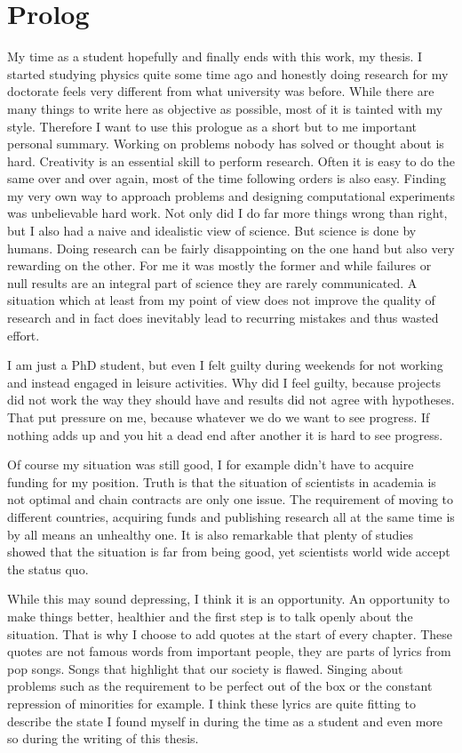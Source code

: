 \section*{Prolog}
\label{sec:prolog}
My time as a student hopefully and finally ends with this work, my thesis.
I started studying physics quite some time ago and honestly doing research for my doctorate feels very different from what university was before.
While there are many things to write here as objective as possible, most of it is tainted with my style.
Therefore I want to use this prologue as a short but to me important personal summary.
Working on problems nobody has solved or thought about is hard.
Creativity is an essential skill to perform research.
Often it is easy to do the same over and over again, most of the time following orders is also easy.
Finding my very own way to approach problems and designing computational experiments was unbelievable hard work. 
Not only did I do far more things wrong than right, but I also had a naive and idealistic view of science.
But science is done by humans.
Doing research can be fairly disappointing on the one hand but also very rewarding on the other.
For me it was mostly the former and while failures or null results are an integral part of science they are rarely communicated.
A situation which at least from my point of view does not improve the quality of research and in fact does inevitably lead to recurring mistakes and thus wasted effort.

I am just a PhD student, but even I felt guilty during weekends for not working and instead engaged in leisure activities.
Why did I feel guilty, because projects did not work the way they should have and results did not agree with hypotheses.
That put pressure on me, because whatever we do we want to see progress.
If nothing adds up and you hit a dead end after another it is hard to see progress.

Of course my situation was still good, I for example didn't have to acquire funding for my position.
Truth is that the situation of scientists in academia is not optimal and chain contracts are only one issue.
The requirement of moving to different countries, acquiring funds and publishing research all at the same time is by all means an unhealthy one.
It is also remarkable that plenty of studies showed that the situation is far from being good, yet scientists world wide accept the status quo.

While this may sound depressing, I think it is an opportunity.
An opportunity to make things better, healthier and the first step is to talk openly about the situation.
That is why I choose to add quotes at the start of every chapter.
These quotes are not famous words from important people, they are parts of lyrics from pop songs.
Songs that highlight that our society is flawed.
Singing about problems such as the requirement to be perfect out of the box or the constant repression of minorities for example.
I think these lyrics are quite fitting to describe the state I found myself in during the time as a student and even more so during the writing of this thesis.
